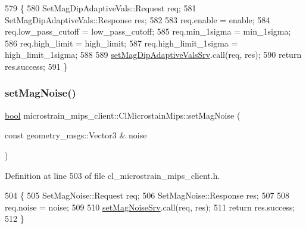 \begin{DoxyCode}
579     \{
580         SetMagDipAdaptiveVals::Request req;
581         SetMagDipAdaptiveVals::Response res;
582 
583         req.enable = enable;
584         req.low\_pass\_cutoff = low\_pass\_cutoff;
585         req.min\_1sigma = min\_1sigma;
586         req.high\_limit = high\_limit;
587         req.high\_limit\_1sigma = high\_limit\_1sigma;
588 
589         \hyperlink{classmicrostrain__mips__client_1_1ClMicrostainMips_a6595253bdcad46fa555b7a43a0303cf8}{setMagDipAdaptiveValsSrv}.call(req, res);
590         \textcolor{keywordflow}{return} res.success;
591     \}
\end{DoxyCode}
\mbox{\label{classmicrostrain__mips__client_1_1ClMicrostainMips_afa4536159f14d7c6df054b3befe5e258}} 
\subsubsection{\texorpdfstring{set\+Mag\+Noise()}{setMagNoise()}}
{\footnotesize\ttfamily \hyperlink{classbool}{bool} microstrain\+\_\+mips\+\_\+client\+::\+Cl\+Microstain\+Mips\+::set\+Mag\+Noise (\begin{DoxyParamCaption}\item[{const geometry\+\_\+msgs\+::\+Vector3 \&}]{noise }\end{DoxyParamCaption})\hspace{0.3cm}{\ttfamily [inline]}}



Definition at line 503 of file cl\+\_\+microstrain\+\_\+mips\+\_\+client.\+h.


\begin{DoxyCode}
504     \{
505         SetMagNoise::Request req;
506         SetMagNoise::Response res;
507 
508         req.noise = noise;
509 
510         \hyperlink{classmicrostrain__mips__client_1_1ClMicrostainMips_ad8ad28ea6efbdfc37a03067c9efa1836}{setMagNoiseSrv}.call(req, res);
511         \textcolor{keywordflow}{return} res.success;
512     \}
\end{DoxyCode}
\mbox{\label{classmicrostrain__mips__client_1_1ClMicrostainMips_a98d008f7c8abc7a7672392cff9551e06}} 
